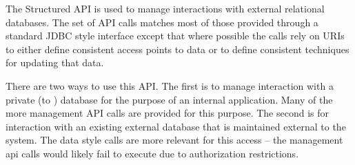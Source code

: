 The Structured API is used to manage interactions with external relational databases. The set
of API calls matches most of those provided through a standard JDBC style interface except that where
possible the calls rely on URIs to either define consistent access points to data or to define consistent
techniques for updating that data.

There are two ways to use this API. The first is to manage interaction with a private (to \Rapture) database
for the purpose of an internal application. Many of the more management API calls are provided for this purpose. The
second is for interaction with an existing external database that is maintained external to the \Rapture system. The data style
calls are more relevant for this access -- the management api calls would likely fail to execute due to authorization restrictions.
